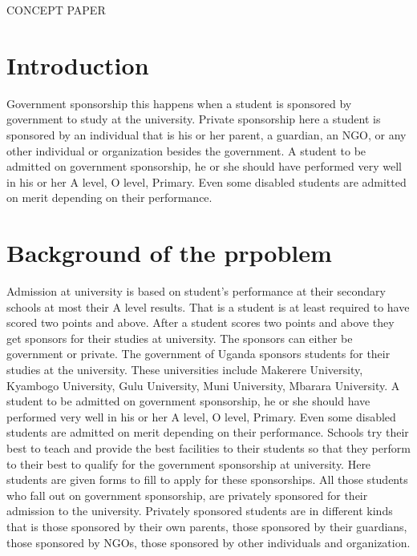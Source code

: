 \documentclass[12]{article}
\begin{document}
\begin{title}
\huge{CONCEPT PAPER }
\end{title}
\maketitle
\author{TAGUYISIZA YAHAYA	14/U/15104/PS	214009743}
\section{Introduction}
Government sponsorship this happens when a student is sponsored by government to study at the university. Private sponsorship here a student is sponsored by an individual that is his or her parent, a guardian, an NGO, or any other individual or organization besides the government. A student to be admitted on government sponsorship, he or she should have performed very well in his or her A level, O level, Primary. Even some disabled students are admitted on merit depending on their performance. 
\section{Background of the prpoblem}
Admission at university is based on student’s performance at their secondary schools at most their A level results. That is a student is at least required to have scored two points and above. After a student scores two points and above they get sponsors for their studies at university. The sponsors can either be government or private. The government of Uganda sponsors students for their studies at the university. These universities include Makerere University, Kyambogo University, Gulu University, Muni University, Mbarara University. A student to be admitted on government sponsorship, he or she should have performed very well in his or her A level, O level, Primary. Even some disabled students are admitted on merit depending on their performance. Schools try their best to teach and provide the best facilities to their students so that they perform to their best to qualify for the government sponsorship at university. Here students are given forms to fill to apply for these sponsorships. All those students who fall out on government sponsorship, are privately sponsored for their admission to the university.
Privately sponsored students are in different kinds that is those sponsored by their own parents, those sponsored by their guardians, those sponsored by NGOs, those sponsored by other individuals and organization. 
\end{document}
